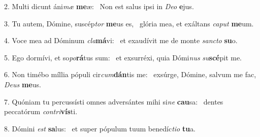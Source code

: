 2. Multi dicunt áni\textit{mæ} \textbf{me}æ: \ast\  Non est salus ipsi in \textit{De}\textit{o} \textbf{e}jus.\

3. Tu autem, Dómine, suscép\textit{tor} \textbf{me}us es, \ast\  glória mea, et exáltans \textit{ca}\textit{put} \textbf{me}um.\

4. Voce mea ad Dóminum \textit{cla}\textbf{má}vi: \ast\  et exaudívit me de monte \textit{sanc}\textit{to} \textbf{su}o.\

5. Ego dormívi, et so\textit{po}\textbf{rá}tus sum: \ast\  et exsurréxi, quia Dómi\textit{nus} \textit{su}\textbf{scé}pit me.\

6. Non timébo míllia pópuli cir\textit{cum}\textbf{dán}tis me: \ast\  exsúrge, Dómine, salvum me fac, \textit{De}\textit{us} \textbf{me}us.\

7. Quóniam tu percussísti omnes adversántes mihi si\textit{ne} \textbf{cau}sa: \ast\  dentes peccatórum \textit{con}\textit{tri}\textbf{vís}ti.\

8. Dómini \textit{est} \textbf{sa}lus: \ast\  et super pópulum tuum benedíc\textit{ti}\textit{o} \textbf{tu}a.\

